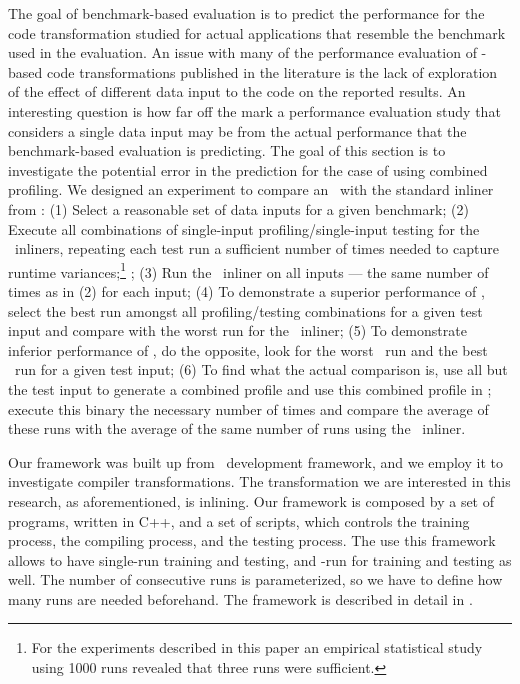 
The goal of benchmark-based evaluation is to predict the performance for the code transformation studied for actual applications that resemble the benchmark used in the evaluation. An issue with many of the performance evaluation of \FDO-based code transformations published in the literature is the lack of exploration of the effect of different data input to the code on the reported results. An interesting question is how far off the mark a performance evaluation study that considers a single data input may be from the actual performance that the benchmark-based evaluation is predicting. The goal of this section is to investigate the potential error in the prediction for the case of \FDI using combined profiling. We designed an experiment to compare an \FDI\ with the standard inliner from \llvm: (1) Select a reasonable set of data inputs for a given benchmark; (2) Execute all combinations of single-input profiling/single-input testing for the \FDO\ inliners, repeating each test run a sufficient number of times needed to capture runtime variances;\footnote{For the experiments described in this paper an empirical statistical study using 1000 runs revealed that three runs were sufficient.} ; (3) Run the \llvm\ inliner on all inputs --- the same number of times as in (2) for each input; (4) To demonstrate a superior performance of \FDI, select the best run amongst all profiling/testing combinations for a given test input and compare with the worst run for the \llvm\ inliner; (5) To demonstrate inferior performance of \FDI, do the opposite, look for the worst \FDI\ run and the best \llvm\ run for a given test input; (6) To find what the actual comparison is, use all but the test input to generate a combined profile and use this combined profile in \FDI; execute this binary the necessary number of times and compare the average of these runs with the average of the same number of runs using the \llvm\ inliner.


Our framework was built up from \llvm\ development framework, and we employ it to investigate compiler transformations. The transformation we are interested in this research, as aforementioned, is inlining. Our framework is composed by a set of programs, written in C++, and a set of scripts, which controls the training process, the compiling process, and the testing process. The use this framework allows to have single-run training and testing, and \CP-run for training and testing as well. The number of consecutive runs is parameterized, so we have to define how many runs are needed beforehand. The framework is described in detail in \cite{BerubePhD}.

